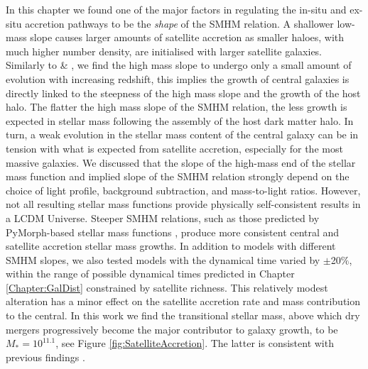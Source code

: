 In this chapter we found one of the major factors in regulating the in-situ and ex-situ accretion pathways to be the \textit{shape} of the SMHM relation. A shallower low-mass slope causes larger amounts of satellite accretion as smaller haloes, with much higher number density, are initialised with larger satellite galaxies. Similarly to \citet{Shankar2006NewFormation} \& \citet{Moster2018Emerge10}, we find the high mass slope to undergo only a small amount of evolution with increasing redshift, this implies the growth of central galaxies is directly linked to the steepness of the high mass slope and the growth of the host halo. The flatter the high mass slope of the SMHM relation, the less growth is expected in stellar mass following the assembly of the host dark matter halo. In turn, a weak evolution in the stellar mass content of the central galaxy can be in tension with what is expected from satellite accretion, especially for the most massive galaxies. We discussed that the slope of the high-mass end of the stellar mass function and implied slope of the SMHM relation strongly depend on the choice of light profile, background subtraction, and mass-to-light ratios. However, not all resulting stellar mass functions provide physically self-consistent results in a LCDM Universe. Steeper SMHM relations, such as those predicted by PyMorph-based stellar mass functions \citep{Bernardi2013TheProfile}, produce more consistent central and satellite accretion stellar mass growths. In addition to models with different SMHM slopes, we also tested models with the dynamical time varied by $\pm$20$\%$, within the range of possible dynamical times predicted in Chapter \ref{Chapter:GalDist} constrained by satellite richness. This relatively modest alteration has a minor effect on the satellite accretion rate and mass contribution to the central. In this work we find the transitional stellar mass, above which dry mergers progressively become the major contributor to galaxy growth, to be $M_{*} = 10^{11.1}$, see Figure \ref{fig:SatelliteAccretion}. The latter is consistent with previous findings \citep[e.g.,][]{Bernardi2011EvidenceRelations, Cappellari2013EffectEvolution, Shankar2013SizeUniverse}.


